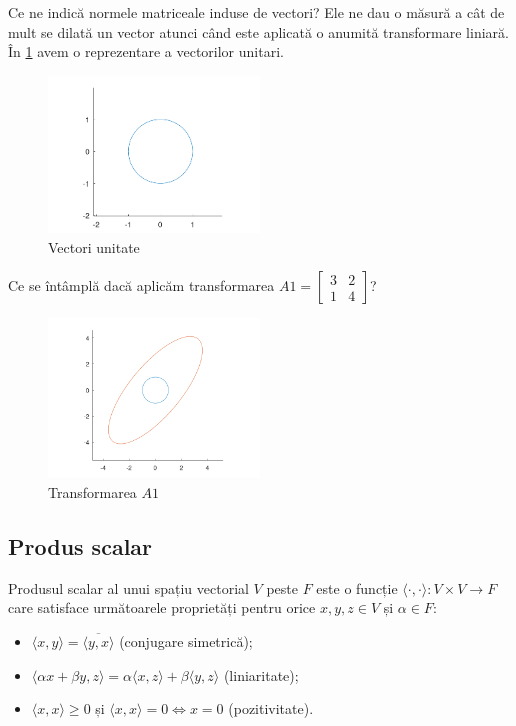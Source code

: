 \documentclass{exam}
\begin{document}
Ce ne indică normele matriceale induse de vectori? Ele ne dau o măsură a
cât de mult se dilată un vector atunci când este aplicată o anumită transformare
liniară. În \ref{fig:1} avem o reprezentare a vectorilor unitari.

\begin{figure}[ht]
	\centering
	\includegraphics[width=0.5\textwidth]{plot1}
	\caption{Vectori unitate}
	\label{fig:1}
\end{figure}

\newpage
Ce se întâmplă dacă aplicăm transformarea $A1 = \begin{bmatrix} 3 & 2 \\ 1 & 4 \end{bmatrix}$?

\begin{figure}[ht]
	\centering
	\includegraphics[width=0.5\textwidth]{plot2}
	\caption{Transformarea $A1$}
	\label{fig:2}
\end{figure}

\subsection{Produs scalar}

Produsul scalar al unui spațiu vectorial $V$ peste $F$ este o funcție
$\langle \cdot, \cdot \rangle: V \times V \rightarrow F$ care satisface
următoarele proprietăți pentru orice $x, y, z \in V$ și $\alpha \in F$:
\begin{itemize}
	\item $\langle x, y \rangle = \overline{\langle y, x \rangle}$ (conjugare simetrică);
	\item $\langle \alpha x + \beta y, z \rangle = \alpha \langle x, z \rangle + \beta \langle y, z \rangle$ (liniaritate);
	\item $\langle x, x \rangle \geq 0$ și $\langle x, x \rangle = 0 \Leftrightarrow x = 0$ (pozitivitate).
\end{itemize}
\end{document}
